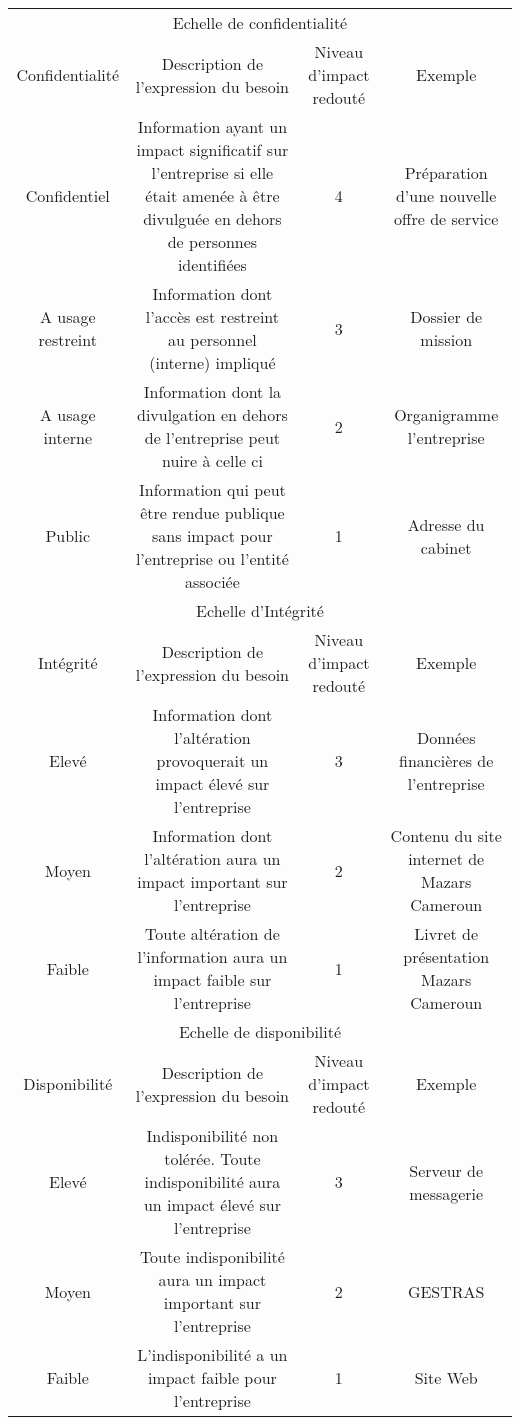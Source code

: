\begin{center}
    \begin{tabular}{|c|c|c|c}
        \hline
        \multicolumn{4}{|c|}{Echelle de confidentialité} \\
         Confidentialité & Description de l'expression du besoin & Niveau d'impact redouté & Exemple  \\
         Confidentiel & Information ayant un impact significatif sur l’entreprise si elle était amenée à être divulguée en dehors de personnes identifiées & 4 & Préparation d’une nouvelle offre de service \\
         A usage restreint & Information dont l’accès est restreint au personnel (interne) impliqué & 3 & Dossier de mission \\
         A usage interne & Information dont la divulgation en dehors de l’entreprise peut nuire à celle ci & 2 & Organigramme  l’entreprise \\
         Public & Information qui peut être rendue publique sans impact pour l’entreprise ou l’entité associée & 1 & Adresse du cabinet \\
         \hline
        \multicolumn{4}{|c|}{Echelle d'Intégrité} \\
        Intégrité & Description de l'expression du besoin & Niveau d'impact redouté & Exemple \\
        Elevé & Information dont l’altération provoquerait un impact élevé sur l’entreprise & 3 & Données financières de l'entreprise\\
        Moyen & Information dont l’altération aura un impact important sur l’entreprise & 2 & Contenu du site internet de Mazars Cameroun \\
        Faible & Toute altération de l’information aura un impact faible sur l’entreprise & 1 & Livret de présentation Mazars Cameroun \\
        \hline
        \multicolumn{4}{|c|}{Echelle de disponibilité}\\
        Disponibilité & Description de l'expression du besoin & Niveau d'impact redouté & Exemple \\
        Elevé & Indisponibilité non tolérée. Toute indisponibilité aura un impact élevé sur l’entreprise & 3 & Serveur de messagerie \\
        Moyen & Toute indisponibilité aura un impact important sur l’entreprise & 2 & GESTRAS \\
        Faible & L’indisponibilité a un impact faible pour l’entreprise & 1 & Site Web \\
        \hline 
    \end{tabular}
\end{center}
